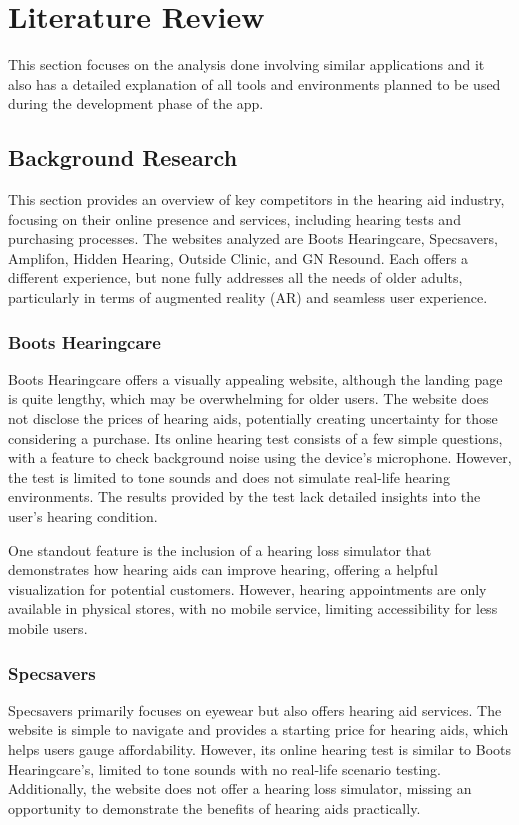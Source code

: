 \documentclass{article}
\begin{document}
\newpage
\fancyhead[L]{} 

\section{Literature Review}
This section focuses on the analysis done involving similar applications and it also has a detailed explanation of all tools and environments planned to be used during the development phase of the app.

\subsection{Background Research}
This section provides an overview of key competitors in the hearing aid industry, focusing on their online presence and services, including hearing tests and purchasing processes. The websites analyzed are Boots Hearingcare, Specsavers, Amplifon, Hidden Hearing, Outside Clinic, and GN Resound. Each offers a different experience, but none fully addresses all the needs of older adults, particularly in terms of augmented reality (AR) and seamless user experience.

\subsubsection{Boots Hearingcare}
Boots Hearingcare offers a visually appealing website, although the landing page is quite lengthy, which may be overwhelming for older users. The website does not disclose the prices of hearing aids, potentially creating uncertainty for those considering a purchase. Its online hearing test consists of a few simple questions, with a feature to check background noise using the device’s microphone. However, the test is limited to tone sounds and does not simulate real-life hearing environments. The results provided by the test lack detailed insights into the user's hearing condition.

One standout feature is the inclusion of a hearing loss simulator that demonstrates how hearing aids can improve hearing, offering a helpful visualization for potential customers. However, hearing appointments are only available in physical stores, with no mobile service, limiting accessibility for less mobile users.

\subsubsection{Specsavers}
Specsavers primarily focuses on eyewear but also offers hearing aid services. The website is simple to navigate and provides a starting price for hearing aids, which helps users gauge affordability. However, its online hearing test is similar to Boots Hearingcare's, limited to tone sounds with no real-life scenario testing. Additionally, the website does not offer a hearing loss simulator, missing an opportunity to demonstrate the benefits of hearing aids practically.
\end{document}
